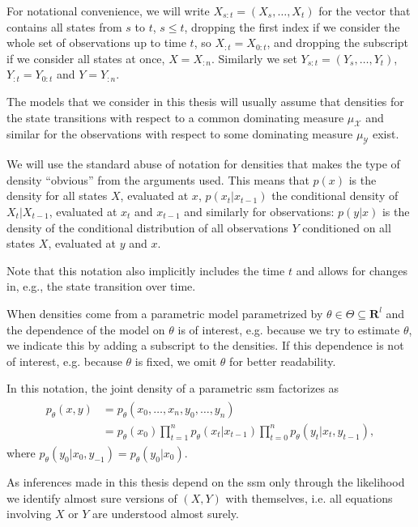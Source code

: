 For notational convenience, we will write $X_{s:t} = \left(X_s, \dots, X_{t}\right)$ for the vector that contains all states from $s$ to $t$, $s \leq t$, dropping the first index if we consider the whole set of observations up to time $t$, so $X_{:t} = X_{0:t}$, and dropping the subscript if we consider all states at once, $X = X_{:n}$.
Similarly we set $Y_{s:t} = \left(Y_s, \dots, Y_{t}\right)$, $Y_{:t} = Y_{0:t}$ and $Y = Y_{:n}$.

The models that we consider in this thesis will usually assume that densities for the state transitions with respect to a common dominating measure $\mu_{\mathcal X}$ and similar for the observations with respect to some dominating measure $\mu_{\mathcal Y}$ exist. 

\begin{notation}
    \label{not:densities}
    We will use the standard abuse of notation for densities that makes the type of density ``{}obvious''{} from the arguments used.
    This means that $p(x)$ is the density for all states $X$, evaluated at $x$, $p(x_t|x_{t - 1})$ the conditional density of $X_t|X_{t - 1}$, evaluated at $x_{t}$ and $x_{t - 1}$ and similarly for observations: $p(y|x)$ is the density of the conditional distribution of all observations $Y$ conditioned on all states $X$, evaluated at $y$ and $x$.

    Note that this notation also implicitly includes the time $t$ and allows for changes in, e.g., the state transition over time.

    When densities come from a parametric model parametrized by $\theta \in \Theta \subseteq \mathbf{R}^{l}$ and the dependence of the model on $\theta$ is of interest, e.g. because we try to estimate $\theta$, we indicate this by adding a subscript to the densities.
    If this dependence is not of interest, e.g. because $\theta$ is fixed, we omit $\theta$ for better readability.

    In this notation, the joint density of a parametric \gls{ssm} factorizes as
    \begin{align}
        \label{eq:joint_density}
        \begin{split}
        p_\theta(x,y) & = p_\theta(x_0, \dots, x_{n}, y_0, \dots, y_{n})                                                              \\
                      & = p_\theta (x_0)\prod_{t = 1}^{n} p_\theta(x_{t}|x_{t - 1}) \prod_{t = 0}^{n} p_\theta(y_t | x_t, y_{t - 1}),
        \end{split}
    \end{align}
    where $p_\theta(y_0|x_0, y_{-1}) = p_\theta(y_0| x_0)$.

    As inferences made in this thesis depend on the \gls{ssm} only through the likelihood we identify almost sure versions of $(X, Y)$ with themselves, i.e. all equations involving $X$ or $Y$ are understood almost surely.
\end{notation}

